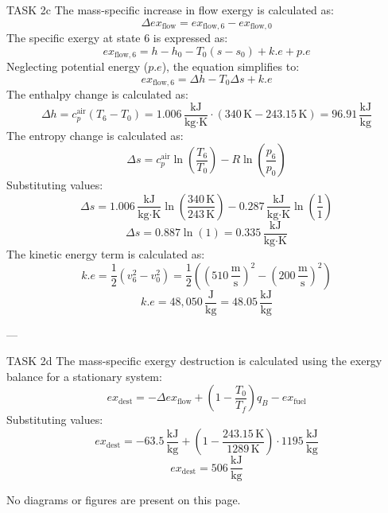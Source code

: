 TASK 2c  
The mass-specific increase in flow exergy is calculated as:  
\[
\Delta ex_{\text{flow}} = ex_{\text{flow},6} - ex_{\text{flow},0}
\]  
The specific exergy at state 6 is expressed as:  
\[
ex_{\text{flow},6} = h - h_0 - T_0 (s - s_0) + k.e + p.e
\]  
Neglecting potential energy (\(p.e\)), the equation simplifies to:  
\[
ex_{\text{flow},6} = \Delta h - T_0 \Delta s + k.e
\]  
The enthalpy change is calculated as:  
\[
\Delta h = c_p^{\text{air}} (T_6 - T_0) = 1.006 \, \frac{\text{kJ}}{\text{kg·K}} \cdot (340 \, \text{K} - 243.15 \, \text{K}) = 96.91 \, \frac{\text{kJ}}{\text{kg}}
\]  
The entropy change is calculated as:  
\[
\Delta s = c_p^{\text{air}} \ln\left(\frac{T_6}{T_0}\right) - R \ln\left(\frac{p_6}{p_0}\right)
\]  
Substituting values:  
\[
\Delta s = 1.006 \, \frac{\text{kJ}}{\text{kg·K}} \ln\left(\frac{340 \, \text{K}}{243 \, \text{K}}\right) - 0.287 \, \frac{\text{kJ}}{\text{kg·K}} \ln\left(\frac{1}{1}\right)
\]  
\[
\Delta s = 0.887 \ln(1) = 0.335 \, \frac{\text{kJ}}{\text{kg·K}}
\]  
The kinetic energy term is calculated as:  
\[
k.e = \frac{1}{2} (v_6^2 - v_0^2) = \frac{1}{2} \left((510 \, \frac{\text{m}}{\text{s}})^2 - (200 \, \frac{\text{m}}{\text{s}})^2\right)
\]  
\[
k.e = 48,050 \, \frac{\text{J}}{\text{kg}} = 48.05 \, \frac{\text{kJ}}{\text{kg}}
\]  

---

TASK 2d  
The mass-specific exergy destruction is calculated using the exergy balance for a stationary system:  
\[
ex_{\text{dest}} = -\Delta ex_{\text{flow}} + \left(1 - \frac{T_0}{T_f}\right) q_B - ex_{\text{fuel}}
\]  
Substituting values:  
\[
ex_{\text{dest}} = -63.5 \, \frac{\text{kJ}}{\text{kg}} + \left(1 - \frac{243.15 \, \text{K}}{1289 \, \text{K}}\right) \cdot 1195 \, \frac{\text{kJ}}{\text{kg}}
\]  
\[
ex_{\text{dest}} = 506 \, \frac{\text{kJ}}{\text{kg}}
\]  

No diagrams or figures are present on this page.